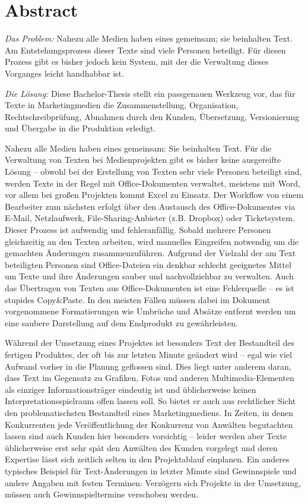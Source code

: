 \documentclass[11pt,a4paper]{article}
\begin{document}
\pagebreak

\section{Abstract}

\emph{Das Problem:} Nahezu alle Medien haben eines gemeinsam; sie beinhalten Text. Am Entstehungsprozess dieser Texte sind viele Personen beteiligt. Für diesen Prozess gibt es bisher jedoch kein System, mit der die Verwaltung dieses Vorganges leicht handhabbar ist.

\emph{Die Lösung:} Diese Bachelor-Thesis stellt ein passgenauen Werkzeug vor, das für Texte in Marketingmedien die Zusammenstellung, Organisation, Rechtschreibprüfung, Abnahmen durch den Kunden, Übersetzung, Versionierung und Übergabe in die Produktion erledigt.

Nahezu alle Medien haben eines gemeinsam: Sie beinhalten Text. Für die Verwaltung von Texten bei Medienprojekten gibt es bisher keine ausgereifte Lösung – obwohl bei der Erstellung von Texten sehr viele Personen beteiligt sind, werden Texte in der Regel mit Office-Dokumenten verwaltet, meistens mit Word, vor allem bei großen Projekten kommt Excel zu Einsatz. Der Workflow von einem Bearbeiter zum nächsten erfolgt über den Austausch des Office-Dokumentes via E-Mail, Netzlaufwerk, File-Sharing-Anbieter (z.B. Dropbox) oder Ticketsystem. Dieser Prozess ist aufwendig und fehleranfällig. Sobald mehrere Personen gleichzeitig an den Texten arbeiten, wird manuelles Eingreifen notwendig um die gemachten Änderungen zusammenzuführen. Aufgrund der Vielzahl der am Text beteiligten Personen sind Office-Dateien ein denkbar schlecht geeignetes Mittel um Texte und ihre Änderungen sauber und nachvollziehbar zu verwalten. Auch das Übertragen von Texten aus Office-Dokumenten ist eine Fehlerquelle – es ist stupides Copy\&Paste. In den meisten Fällen müssen dabei im Dokument vorgenommene Formatierungen wie Umbrüche und Absätze entfernt werden um eine saubere Darstellung auf dem Endprodukt zu gewährleisten.

Während der Umsetzung eines Projektes ist besonders Text der Bestandteil des fertigen Produktes, der oft bis zur letzten Minute geändert wird – egal wie viel Aufwand vorher in die Planung geflossen sind. Dies liegt unter anderem daran, dass Text im Gegensatz zu Grafiken, Fotos und anderen Multimedia-Elementen als einziger Informationsträger eindeutig ist und üblicherweise keinen Interpretationsspielraum offen lassen soll. So bietet er auch aus rechtlicher Sicht den problematischsten Bestandteil eines Marketingmediens. In Zeiten, in denen Konkurrenten jede Veröffentlichung der Konkurrenz von Anwälten begutachten lassen sind auch Kunden hier besonders vorsichtig – leider werden aber Texte üblicherweise erst sehr spät den Anwälten des Kunden vorgelegt und deren Expertise lässt sich zeitlich selten in den Projektablauf einplanen. Ein anderes typisches Beispiel für Text-Änderungen in letzter Minute sind Gewinnspiele und andere Angaben mit festen Terminen: Verzögern sich Projekte in der Umsetzung, müssen auch Gewinnspieltermine verschoben werden. 
\end{document}
